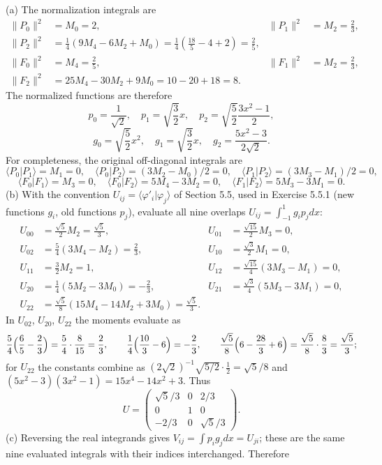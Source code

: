 (a) The normalization integrals are
\begin{align*}
\|P_0\|^2&=M_0=2,&\|P_1\|^2&=M_2=\frac23,\\
\|P_2\|^2&=\frac14(9M_4-6M_2+M_0)
=\frac14\left(\frac{18}5-4+2\right)=\frac25,\\
\|F_0\|^2&=M_4=\frac25,&\|F_1\|^2&=M_2=\frac23,\\
\|F_2\|^2&=25M_4-30M_2+9M_0=10-20+18=8.
\end{align*}
The normalized functions are therefore
\[
p_0=\frac1{\sqrt2},\quad p_1=\sqrt{\frac32}x,\quad
p_2=\sqrt{\frac52}\frac{3x^2-1}{2},
\]
\[
g_0=\sqrt{\frac52}x^2,\quad g_1=\sqrt{\frac32}x,\quad
g_2=\frac{5x^2-3}{2\sqrt2}.
\]
For completeness, the original off-diagonal integrals are
\[
\langle P_0|P_1\rangle=M_1=0,\quad
\langle P_0|P_2\rangle=(3M_2-M_0)/2=0,\quad
\langle P_1|P_2\rangle=(3M_3-M_1)/2=0,
\]
\[
\langle F_0|F_1\rangle=M_3=0,\quad
\langle F_0|F_2\rangle=5M_4-3M_2=0,\quad
\langle F_1|F_2\rangle=5M_3-3M_1=0.
\]
(b) With the convention $U_{ij}=\langle\varphi'_i|\varphi_j\rangle$ of
Section 5.5, used in Exercise 5.5.1 (new functions $g_i$, old functions
$p_j$), evaluate all
nine overlaps $U_{ij}=\int_{-1}^1g_ip_jdx$:
\begin{align*}
U_{00}&=\frac{\sqrt5}{2}M_2=\frac{\sqrt5}{3},&
U_{01}&=\frac{\sqrt{15}}2M_3=0,\\
U_{02}&=\frac54(3M_4-M_2)=\frac23,&
U_{10}&=\frac{\sqrt3}{2}M_1=0,\\
U_{11}&=\frac32M_2=1,&
U_{12}&=\frac{\sqrt{15}}4(3M_3-M_1)=0,\\
U_{20}&=\frac14(5M_2-3M_0)=-\frac23,&
U_{21}&=\frac{\sqrt3}{4}(5M_3-3M_1)=0,\\
U_{22}&=\frac{\sqrt5}{8}(15M_4-14M_2+3M_0)
=\frac{\sqrt5}{3}.&&
\end{align*}
In $U_{02}$, $U_{20}$, $U_{22}$ the moments evaluate as
\[
\frac54\Bigl(\frac65-\frac23\Bigr)=\frac54\cdot\frac8{15}=\frac23,\qquad
\frac14\Bigl(\frac{10}3-6\Bigr)=-\frac23,\qquad
\frac{\sqrt5}8\Bigl(6-\frac{28}3+6\Bigr)=\frac{\sqrt5}8\cdot\frac83
=\frac{\sqrt5}3;
\]
for $U_{22}$ the constants combine as
$(2\sqrt2)^{-1}\sqrt{5/2}\cdot\frac12=\sqrt5/8$ and
$(5x^2-3)(3x^2-1)=15x^4-14x^2+3$. Thus
\[
\boxed{U=\begin{pmatrix}\sqrt5/3&0&2/3\\0&1&0\\-2/3&0&\sqrt5/3\end{pmatrix}.}
\]
(c) Reversing the real integrands gives
$V_{ij}=\int p_ig_jdx=U_{ji}$; these are the same nine evaluated
integrals with their indices interchanged. Therefore
